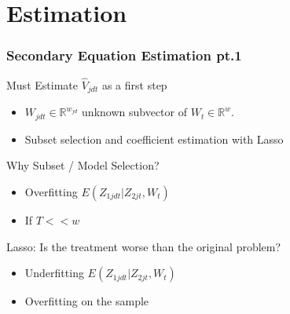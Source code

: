 \documentclass[9pt]{beamer}
\begin{document}
\section{Estimation}
\begin{frame} 
\frametitle{Secondary Equation Estimation pt.1 } 


Must Estimate $\hat{V}_{jdt}$ as a first step \\
\begin{itemize} \addtolength{\itemsep}{\baselineskip}
    \item $W_{jdt} \in \mathbb{R}^{w_{jd}}$ unknown subvector of $W_t \in \mathbb{R}^w$. 
    \item Subset selection and coefficient estimation with Lasso
\end{itemize}




\vspace{0.5cm}
Why Subset / Model Selection? \\

\begin{itemize} \addtolength{\itemsep}{\baselineskip}

	\item Overfitting $E(Z_{1jdt} | Z_{2jt},W_{t})$ 
       
       \item If $T<< w$

\end{itemize} 
\vspace{0.5cm}
 Lasso: Is the treatment worse than the original problem? \\

\begin{itemize} \addtolength{\itemsep}{\baselineskip}

	\item Underfitting $E(Z_{1jdt} | Z_{2jt},W_{t})$ 
       
      \item Overfitting on the sample 
     

\end{itemize} 



\end{frame}

\end{document}
